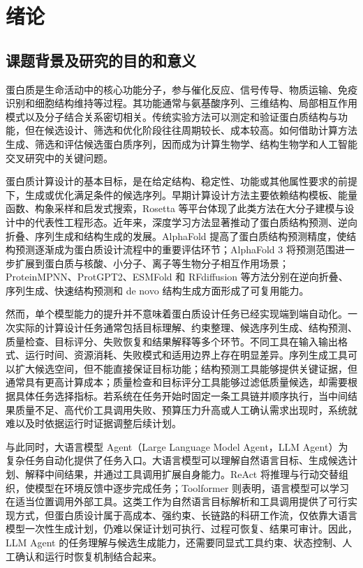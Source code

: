 \section{绪论}\label{ux7eeaux8bba}

\subsection{课题背景及研究的目的和意义}\label{ux8bfeux9898ux80ccux666fux53caux7814ux7a76ux7684ux76eeux7684ux548cux610fux4e49}

蛋白质是生命活动中的核心功能分子，参与催化反应、信号传导、物质运输、免疫识别和细胞结构维持等过程。其功能通常与氨基酸序列、三维结构、局部相互作用模式以及分子结合关系密切相关。传统实验方法可以测定和验证蛋白质结构与功能，但在候选设计、筛选和优化阶段往往周期较长、成本较高。如何借助计算方法生成、筛选和评估候选蛋白质序列，因而成为计算生物学、结构生物学和人工智能交叉研究中的关键问题。

蛋白质计算设计的基本目标，是在给定结构、稳定性、功能或其他属性要求的前提下，生成或优化满足条件的候选序列。早期计算设计方法主要依赖结构模板、能量函数、构象采样和启发式搜索，Rosetta
等平台体现了此类方法在大分子建模与设计中的代表性工程形态\citep{leaverfay2011rosetta3}。近年来，深度学习方法显著推动了蛋白质结构预测、逆向折叠、序列生成和结构生成的发展。AlphaFold
提高了蛋白质结构预测精度，使结构预测逐渐成为蛋白质设计流程中的重要评估环节\citep{jumper2021alphafold}；AlphaFold
3
将预测范围进一步扩展到蛋白质与核酸、小分子、离子等生物分子相互作用场景\citep{abramson2024alphafold3}；ProteinMPNN、ProtGPT2、ESMFold
和 RFdiffusion 等方法分别在逆向折叠、序列生成、快速结构预测和 de novo
结构生成方面形成了可复用能力\citep{dauparas2022proteinmpnn, ferruz2022protgpt2, lin2023esmfold, watson2023rfdiffusion}。

然而，单个模型能力的提升并不意味着蛋白质设计任务已经实现端到端自动化。一次实际的计算设计任务通常包括目标理解、约束整理、候选序列生成、结构预测、质量检查、目标评分、失败恢复和结果解释等多个环节。不同工具在输入输出格式、运行时间、资源消耗、失败模式和适用边界上存在明显差异。序列生成工具可以扩大候选空间，但不能直接保证目标功能；结构预测工具能够提供关键证据，但通常具有更高计算成本；质量检查和目标评分工具能够过滤低质量候选，却需要根据具体任务选择指标。若系统在任务开始时固定一条工具链并顺序执行，当中间结果质量不足、高代价工具调用失败、预算压力升高或人工确认需求出现时，系统就难以及时依据运行时证据调整后续计划。

与此同时，大语言模型 Agent（Large Language Model Agent，LLM
Agent）为复杂任务自动化提供了任务入口。大语言模型可以理解自然语言目标、生成候选计划、解释中间结果，并通过工具调用扩展自身能力。ReAct
将推理与行动交替组织，使模型在环境反馈中逐步完成任务\citep{yao2022react}；Toolformer
则表明，语言模型可以学习在适当位置调用外部工具\citep{schick2023toolformer}。这类工作为自然语言目标解析和工具调用提供了可行实现方式，但蛋白质设计属于高成本、强约束、长链路的科研工作流，仅依靠大语言模型一次性生成计划，仍难以保证计划可执行、过程可恢复、结果可审计。因此，LLM
Agent
的任务理解与候选生成能力，还需要同显式工具约束、状态控制、人工确认和运行时恢复机制结合起来。

